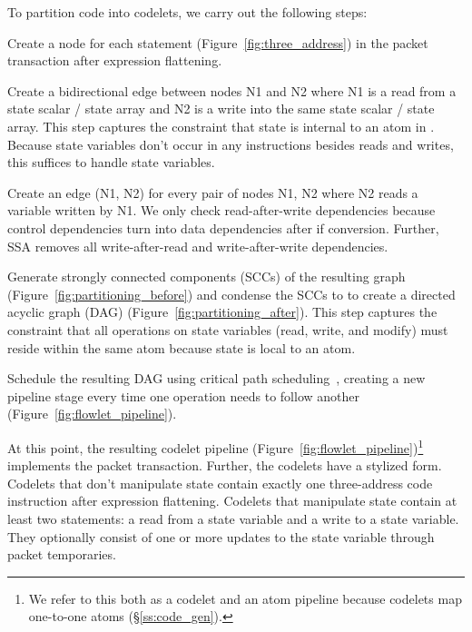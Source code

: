 To partition code into codelets, we carry out the following steps:
\begin{CompactEnumerate}
  \item Create a node for each statement (Figure~\ref{fig:three_address}) in
    the packet transaction after expression flattening.
  \item Create a bidirectional edge between nodes N1 and N2 where N1 is a read from a
    state scalar / state array and N2 is a write into the same state scalar /
    state array. This step captures the constraint that state is internal to an
    atom in \absmachine. Because state variables don't occur in any
    instructions besides reads and writes, this suffices to handle state variables.
  \item Create an edge (N1, N2) for every pair of nodes N1, N2 where N2 reads
    a variable written by N1. We only check read-after-write dependencies because
    control dependencies turn into data dependencies after if conversion. Further,
    SSA removes all write-after-read and write-after-write dependencies.
  \item Generate strongly connected components (SCCs) of the resulting graph
    (Figure~\ref{fig:partitioning_before}) and condense the SCCs to to create a directed
    acyclic graph (DAG) (Figure~\ref{fig:partitioning_after}). This step captures the
    constraint that all operations on state variables (read, write, and modify)
    must reside within the same atom because state is local to an atom.
  \item Schedule the resulting DAG using critical path
    scheduling~\cite{crit_path_sched}, creating a new pipeline stage every time
    one operation needs to follow another (Figure~\ref{fig:flowlet_pipeline}).
\end{CompactEnumerate}
At this point, the resulting codelet pipeline
(Figure~\ref{fig:flowlet_pipeline})\footnote{We refer to this both as a codelet
and an atom pipeline because codelets map one-to-one atoms
(\S\ref{ss:code_gen}).} implements the packet transaction.  Further, the
codelets have a stylized form.  Codelets that don't manipulate state contain
exactly one three-address code instruction after expression flattening.
Codelets that manipulate state contain at least two statements: a read from a
state variable and a write to a state variable.  They optionally consist of one
or more updates to the state variable through packet temporaries.

